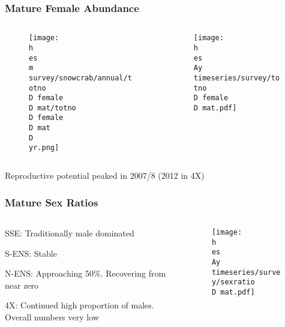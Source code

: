 \documentclass{beamer}
\numberwithin{equation}{section}		%
\numberwithin{figure}{section}	   	%
\numberwithin{table}{section}				%
\newcommand{\yr}{2017}
\newcommand{\D}{.}  %
\newcommand{\h}{C:/} %
\newcommand{\es}{bio.data/bio.snowcrab/} %
\newcommand{\Ay}{assessments/2017/}
\newcommand{\m}{output/maps/} %
\begin{document}
\begin{frame}
\frametitle{Mature Female Abundance}

	\begin{columns}
    \begin{column}{0.5\textwidth}
      \begin{figure}
        \texttt{[image: \\h \\es \\m survey/snowcrab/annual/totno\\D female\\D mat/totno\\D female\\D mat\\D \\yr.png]}	
      \end{figure}
    \end{column}

  	\begin{column}{0.5\textwidth}
      \begin{figure}
        \texttt{[image: \\h \\es \\Ay timeseries/survey/totno\\D female\\D mat.pdf]}
      \end{figure}
    \end{column}
  \end{columns}
Reproductive potential peaked in 2007/8 (2012 in 4X)
\end{frame}

\begin{frame}
\frametitle{Mature Sex Ratios}

\begin{columns}
	\begin{column}{0.3\textwidth}
		\begin{itemize}
		\end{itemize}
	\end{column}
	
	\begin{column}{0.7\textwidth}
		\begin{figure}
			\texttt{[image: \\h \\es \\Ay timeseries/survey/sexratio\\D mat.pdf]}
		\end{figure}
	\end{column}
	
\end{columns}
\end{frame}
\end{document}
